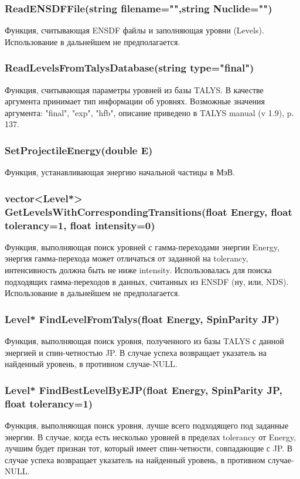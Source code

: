 \documentclass[a4paper,12pt]{extarticle}
\begin{document}
\subsubsection{ReadENSDFFile(string filename="",string Nuclide="")}
Функция, считывающая ENSDF файлы и заполняющая уровни (Levels). Использование в дальнейшем не предполагается.
\subsubsection{ReadLevelsFromTalysDatabase(string type="final")}
Функция, считывающая параметры уровней из базы TALYS. В качестве аргумента принимает тип информации об уровнях. Возможные значения аргумента: "final", "exp", "hfb", описание приведено в TALYS manual (v 1.9), p. 137.
\subsubsection{SetProjectileEnergy(double E)}
Функция, устанавливающая энергию начальной частицы в МэВ.
\subsubsection{vector<Level*> GetLevelsWithCorrespondingTransitions(float Energy, float tolerancy=1, float intensity=0)}
Функция, выполняющая поиск уровней с гамма-переходами энергии Energy, энергия гамма-перехода может отличаться от заданной на tolerancy, интенсивность должна быть не ниже intensity. Использовалась для поиска подходящих гамма-переходов в данных, считанных из ENSDF (ну, или, NDS). Использование в дальнейшем не предполагается.
\subsubsection{Level* FindLevelFromTalys(float Energy, SpinParity JP)}
Функция, выполняющая поиск уровня, полученного из базы TALYS с данной энергией и спин-четностью JP. В случае успеха возвращает указатель на найденный уровень, в противном случае-NULL.
\subsubsection{Level* FindBestLevelByEJP(float Energy, SpinParity JP, float tolerancy=1)}
Функция, выполняющая поиск уровня, лучше всего подходящего под заданные энергии. В случае, когда есть несколько уровней в пределах tolerancy от Energy, лучшим будет признан тот, который имеет спин-четности, совпадающие с JP. В случае успеха возвращает указатель на найденный уровень, в противном случае-NULL.
\end{document}
